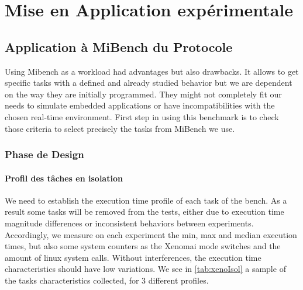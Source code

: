 \documentclass[french, a4paper, 11pt, twoside, pdftex]{StyleThese}
\begin{document}
\setcounter{chapter}{6} %
\dominitoc
\faketableofcontents
\fi

\chapter{Mise en Application expérimentale}

\minitoc

      
    \section{Application à MiBench du Protocole}
            Using Mibench as a workload had advantages but also drawbacks. It allows to get specific tasks with a defined and already studied behavior but we are dependent on the way they are initially programmed. They might not completely fit our needs to simulate embedded applications or have incompatibilities with the chosen real-time environment. First step in using this benchmark is to check those criteria to select precisely the tasks from MiBench we use.
        \subsection{Phase de Design}
            \subsubsection{Profil des tâches en isolation}
            
                    We need to establish the execution time profile of each task of the bench. As a result some tasks will be removed from the tests, either due to execution time magnitude differences or inconsistent behaviors between experiments. 
                    Accordingly, we measure on each experiment the min, max and median execution times, but also some system counters as the Xenomai mode switches and the amount of linux system calls. Without interferences, the execution time characteristics should have low  variations.%
                    We see in \autoref{tab:xenoIsol} a sample of the tasks characteristics collected, for 3 different profiles.
            
\end{document}
